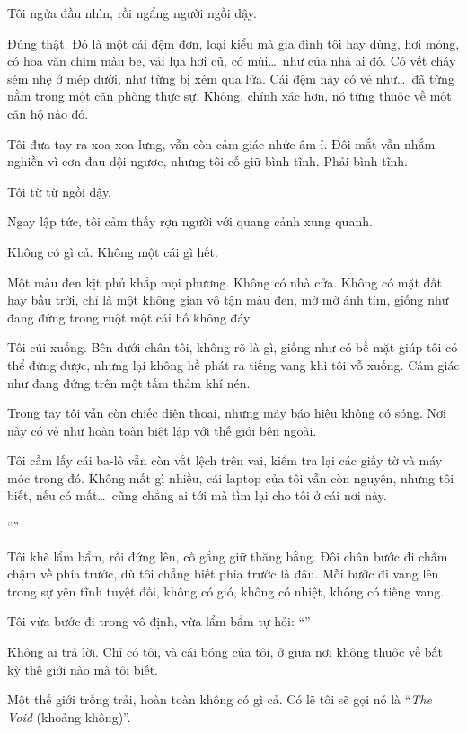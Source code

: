 \documentclass[../main.tex]{subfiles}
\begin{document}
Tôi ngửa đầu nhìn, rồi ngẩng người ngồi dậy.

Đúng thật. Đó là một cái đệm đơn, loại kiểu mà gia đình tôi hay dùng, hơi mỏng, có hoa văn chìm màu be, vải lụa hơi cũ, có mùi\dots\ như của nhà ai đó. Có vết cháy sém nhẹ ở mép dưới, như từng bị xém qua lửa. Cái đệm này có vẻ như\dots\ đã từng nằm trong một căn phòng thực sự. Không, chính xác hơn, nó từng thuộc về một căn hộ nào đó.

Tôi đưa tay ra xoa xoa lưng, vẫn còn cảm giác nhức âm ỉ. Đôi mắt vẫn nhắm nghiền vì cơn đau dội ngược, nhưng tôi cố giữ bình tĩnh. Phải bình tĩnh.

Tôi từ từ ngồi dậy.

Ngay lập tức, tôi cảm thấy rợn người với quang cảnh xung quanh.

Không có gì cả. Không một cái gì hết.

Một màu đen kịt phủ khắp mọi phương. Không có nhà cửa. Không có mặt đất hay bầu trời, chỉ là một không gian vô tận màu đen, mờ mờ ánh tím, giống như đang đứng trong ruột một cái hố không đáy.

Tôi cúi xuống. Bên dưới chân tôi, không rõ là gì, giống như có bề mặt giúp tôi có thể đứng được, nhưng lại không hề phát ra tiếng vang khi tôi vỗ xuống. Cảm giác như đang đứng trên một tấm thảm khí nén.

Trong tay tôi vẫn còn chiếc điện thoại, nhưng máy báo hiệu không có sóng. Nơi này có vẻ như hoàn toàn biệt lập với thế giới bên ngoài.

Tôi cầm lấy cái ba-lô vẫn còn vắt lệch trên vai, kiểm tra lại các giấy tờ và máy móc trong đó. Không mất gì nhiều, cái laptop của tôi vẫn còn nguyên, nhưng tôi biết, nếu có mất\dots\ cũng chẳng ai tới mà tìm lại cho tôi ở cái nơi này.

``''

Tôi khẽ lẩm bẩm, rồi đứng lên, cố gắng giữ thăng bằng. Đôi chân bước đi chầm chậm về phía trước, dù tôi chẳng biết phía trước là đâu. Mỗi bước đi vang lên trong sự yên tĩnh tuyệt đối, không có gió, không có nhiệt, không có tiếng vang.

Tôi vừa bước đi trong vô định, vừa lẩm bẩm tự hỏi: ``''

Không ai trả lời. Chỉ có tôi, và cái bóng của tôi, ở giữa nơi không thuộc về bất kỳ thế giới nào mà tôi biết.

Một thế giới trống trải, hoàn toàn không có gì cả. Có lẽ tôi sẽ gọi nó là ``\emph{The Void} (khoảng không)''.
\end{document}
